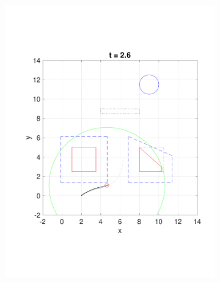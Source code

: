 \begin{figure}
  \centering
  \begin{subfigure}[t]{0.49\columnwidth}
    \includegraphics[width=\columnwidth]{fig/Q8D_Q4D/26}
  \end{subfigure}
  \begin{subfigure}[t]{0.49\columnwidth}

\end{subfigure}
\end{figure}
